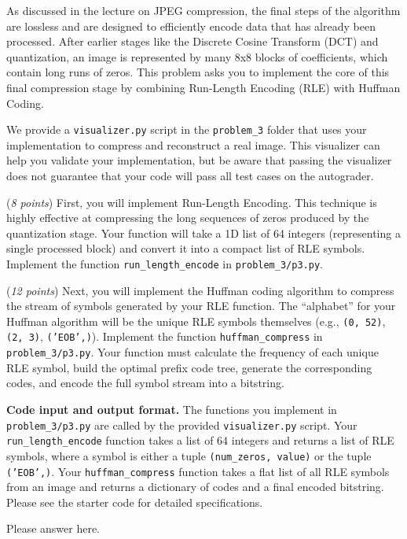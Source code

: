\documentclass{hw_template}
\newcommand{\io}{\textbf{Code input and output format.} }
\begin{document}
%
\begin{problem}
As discussed in the lecture on JPEG compression, the final steps of the algorithm are lossless and are designed to efficiently encode data that has already been processed. After earlier stages like the Discrete Cosine Transform (DCT) and quantization, an image is represented by many 8x8 blocks of coefficients, which contain long runs of zeros. This problem asks you to implement the core of this final compression stage by combining Run-Length Encoding (RLE) with Huffman Coding.

We provide a \texttt{visualizer.py} script in the \texttt{problem\_3} folder that uses your implementation to compress and reconstruct a real image. This visualizer can help you validate your implementation, but be aware that passing the visualizer does not guarantee that your code will pass all test cases on the autograder.

\begin{subproblem}
  (\textit{8 points})
  First, you will implement Run-Length Encoding. This technique is highly effective at compressing the long sequences of zeros produced by the quantization stage. Your function will take a 1D list of 64 integers (representing a single processed block) and convert it into a compact list of RLE symbols. Implement the function \texttt{run\_length\_encode} in \texttt{problem\_3/p3.py}.
\end{subproblem}

\begin{subproblem}
  (\textit{12 points})
  Next, you will implement the Huffman coding algorithm to compress the stream of symbols generated by your RLE function. The ``alphabet'' for your Huffman algorithm will be the unique RLE symbols themselves (e.g., \texttt{(0, 52)}, \texttt{(2, 3)}, \texttt{('EOB',)}). Implement the function \texttt{huffman\_compress} in \texttt{problem\_3/p3.py}. Your function must calculate the frequency of each unique RLE symbol, build the optimal prefix code tree, generate the corresponding codes, and encode the full symbol stream into a bitstring.
\end{subproblem}

\io The functions you implement in \texttt{problem\_3/p3.py} are called by the provided \texttt{visualizer.py} script. Your \texttt{run\_length\_encode} function takes a list of 64 integers and returns a list of RLE symbols, where a symbol is either a tuple \texttt{(num\_zeros, value)} or the tuple \texttt{('EOB',)}. Your \texttt{huffman\_compress} function takes a flat list of all RLE symbols from an image and returns a dictionary of codes and a final encoded bitstring. Please see the starter code for detailed specifications.
\end{problem}
\begin{solution}
    Please answer here.
\end{solution}
\newpage
\end{document}
